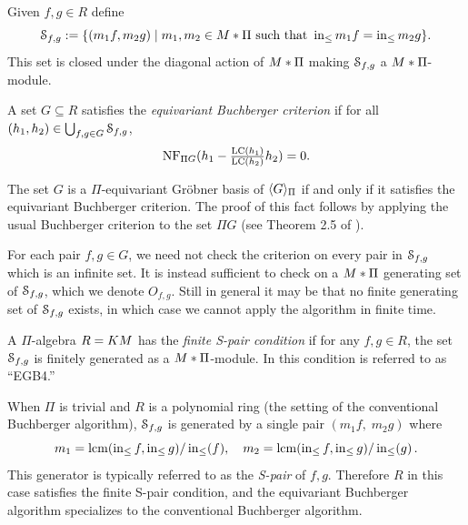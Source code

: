 Given $f,g \in R$ define
 \[ \mathcal S_{f,g} := \{(m_1f,m_2g) \mid m_1,m_2 \in M * \Pi \text{ such that } \operatorname{in}_{\leq} m_1f = \operatorname{in}_{\leq} m_2g\}. \]
This set is closed under the diagonal action of $M *\Pi$ making $\mathcal S_{f,g}$ a $M *\Pi$-module.  

\begin{definition}\label{def:buchberger-criterion}
A set $G \subseteq R$ satisfies the {\em equivariant Buchberger criterion} if for all $(h_1,h_2) \in \bigcup_{f,g\in G} \mathcal S_{f,g}$,
 \[ \operatorname{NF}_{\Pi G}(h_1 - \tfrac{\operatorname{LC}(h_1)}{\operatorname{LC}(h_2)}h_2) = 0. \]
\end{definition}

The set $G$ is a $\Pi$-equivariant Gr\"obner basis of $\langle G \rangle_{\Pi}$ if and only if it satisfies the equivariant Buchberger criterion.  The proof of this fact follows by applying the usual Buchberger criterion to the set $\Pi G$ (see Theorem 2.5 of \cite{Brouwer09e}).

For each pair $f,g \in G$, we need not check the criterion on every pair in $\mathcal S_{f,g}$ which is an infinite set.  It is instead sufficient to check on a $M * \Pi$ generating set of $\mathcal S_{f,g}$, which we denote $O_{f,g}$.  Still in general it may be that no finite generating set of $\mathcal S_{f,g}$ exists, in which case we cannot apply the algorithm in finite time.

\begin{definition}\label{def:finite-s-pair}
 A $\Pi$-algebra $R = KM$ has the {\em finite S-pair condition} if for any $f,g \in R$, the set $\mathcal S_{f,g}$ is finitely generated as a $M * \Pi$-module.  In \cite{Brouwer09e} this condition is referred to as ``EGB4.''
\end{definition}

When $\Pi$ is trivial and $R$ is a polynomial ring (the setting of the conventional Buchberger algorithm), $\mathcal S_{f,g}$ is generated by a single pair $(m_1 f,\; m_2 g)$ where 
$$
m_1 = \operatorname{lcm}(\operatorname{in}_{\leq} f, \operatorname{in}_{\leq} g)/\operatorname{in}_{\leq}(f),\quad
m_2 = \operatorname{lcm}(\operatorname{in}_{\leq} f, \operatorname{in}_{\leq} g)/\operatorname{in}_{\leq}(g)
\,.
$$  
This generator is typically referred to as the {\em S-pair} of $f,g$.  Therefore $R$ in this case satisfies the finite S-pair condition, and the equivariant Buchberger algorithm specializes to the conventional Buchberger algorithm.

